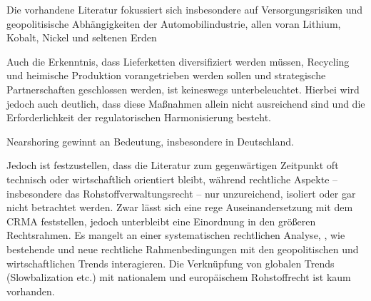 \documentclass[12pt,a4paper,oneside]{book} %
\begin{document}
Die vorhandene Literatur fokussiert sich insbesondere auf Versorgungsrisiken und geopolitisische Abhängigkeiten der Automobilindustrie, allen voran Lithium, Kobalt, Nickel und seltenen Erden  

Auch die Erkenntnis, dass Lieferketten diversifiziert werden müssen, Recycling und heimische Produktion vorangetrieben werden sollen und strategische Partnerschaften geschlossen werden, ist keineswegs unterbeleuchtet.\autocite{https://klardenker.kpmg.de/so-sichert-sich-die-automobilindustrie-kritische-rohstoffe-2/} Hierbei wird jedoch auch deutlich, dass diese Maßnahmen allein nicht ausreichend sind und die Erforderlichkeit der regulatorischen Harmonisierung besteht.

Nearshoring gewinnt an Bedeutung, insbesondere in Deutschland.

Jedoch ist festzustellen, dass die Literatur zum gegenwärtigen Zeitpunkt oft technisch oder wirtschaftlich orientiert bleibt, während rechtliche Aspekte -- insbesondere das Rohstoffverwaltungsrecht -- nur unzureichend, isoliert oder gar nicht betrachtet werden. Zwar lässt sich eine rege Auseinandersetzung mit dem CRMA feststellen, jedoch unterbleibt eine Einordnung in den größeren Rechtsrahmen. Es mangelt an einer systematischen rechtlichen Analyse, , wie bestehende und neue rechtliche Rahmenbedingungen mit den geopolitischen und wirtschaftlichen Trends interagieren. Die Verknüpfung von globalen Trends (Slowbalization etc.) mit nationalem und europäischem Rohstoffrecht ist kaum vorhanden.
\end{document}
